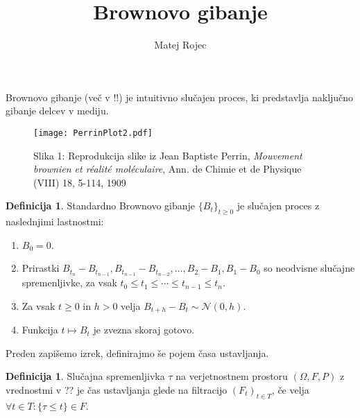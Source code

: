 \documentclass[11pt]{article}
\theoremstyle{plain}
\theoremstyle{definition}
\newtheorem{definicija}[izrek]{Definicija}
\begin{document}
\title{Brownovo gibanje}
\author{Matej Rojec}
\date{}

\maketitle

Brownovo gibanje (več v !!) je intuitivno slučajen proces, %
ki predstavlja naključno gibanje delcev v mediju. 
    
   \begin{figure}[!ht]
    \centering
    \texttt{[image: PerrinPlot2.pdf]}
    \caption{Slika 1: Reprodukcija slike iz Jean Baptiste Perrin, \emph{Mouvement brownien et réalité moléculaire}, Ann. de Chimie et de Physique (VIII) 18, 5-114, 1909}
\end{figure}


  
    \begin{definicija}
        Standardno Brownovo gibanje $\{B_t\}_{t \geq 0}$ je slučajen proces z naslednjimi lastnostmi: 
            
            \begin{enumerate}
                \item $B_0 = 0$.
                \item Prirastki $B_{t_n} - B_{t_{n-1}}, B_{t_{n-1}} - B_{t_{n-2}}, \ldots, B_2 - B_1, B_1 - B_0$ so neodvisne slučajne spremenljivke, za vsak $t_0 \leq t_1 \leq \cdots \leq t_{n-1} \leq t_n$.
                \item Za vsak $t \geq 0$ in $h > 0$ velja $B_{t+h} - B_t \sim \mathcal{N}(0, h)$.
                \item Funkcija $t \mapsto B_t$ je zvezna skoraj gotovo.
            \end{enumerate}
    \end{definicija}
    
    Preden zapišemo izrek, definirajmo še pojem časa ustavljanja.
    
    
    \begin{definicija}
        Slučajna spremenljivka $\tau$ na verjetnostnem prostoru $(\Omega,F,P)$ z vrednostmi v ??
        je čas ustavljanja glede na filtracijo $(F_{t})_{t\in{T}}$, če velja $\forall{t}\in{T}:\{\tau\le{t}\}\in{F}$.
    \end{definicija}
    
\end{document}
